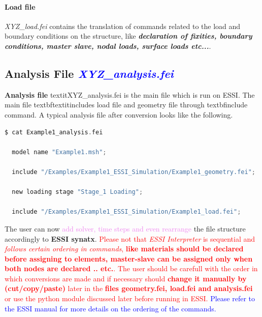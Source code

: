 \documentclass[11pt]{article}
\begin{document}
\paragraph{Load   file}  \textit{XYZ\_load.fei}  contains  the  translation  of
commands  related to the load and boundary conditions on the structure, like
\textbf{\textit{declaration  of fixities, boundary conditions, master slave,
nodal loads, surface loads etc...}}.

\subsection{Analysis File \textcolor{blue}{\textit{XYZ\_analysis.fei}}}

\textbf{Analysis file} textit{XYZ_analysis.fei} is the main file which is run
on ESSI. The main file textbf{textit{includes load file and geometry file}}
through textbf{include command}. A typical analysis file after conversion
looks like the following.

\begin{lstlisting}[language=C]
$ cat Example1_analysis.fei

  model name "Example1.msh";

  include "/Examples/Example1_ESSI_Simulation/Example1_geometry.fei";

  new loading stage "Stage_1 Loading";

  include "/Examples/Example1_ESSI_Simulation/Example1_load.fei";

\end{lstlisting}

The user can now \textcolor{violet}{add solver, time steps and even rearrange}
the file structure accordingly to \textbf{ESSI synatx}.
{\textcolor{red}{Please not that \textit{ESSI Interpreter} is sequential and
\textit{follows certain ordering in commands}, \textbf{like materials should
be declared before assigning to elements, master-slave can be assigned only
when both nodes are declared .. etc.}. The user should be carefull with the
order in which conversions are made and if necessary should \textbf{change it
manually by (cut/copy/paste)} later in the \textbf{files geometry.fei,
load.fei and analysis.fei} or use the python module discussed later before
running in ESSI.}} \textcolor{blue}{{Please refer to the ESSI manual for more
details on the ordering of the commands.}}

\end{document}
